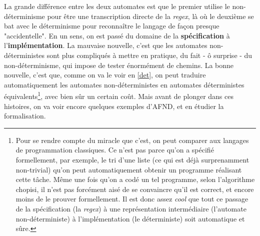 \begin{figure}[!ht]
\centering
{}
\end{figure}

La grande différence entre les deux automates est que le premier utilise le non-déterminisme pour être une transcription directe de la \textit{regex}, là où le deuxième se bat avec le déterminisme pour reconnaître le langage de façon presque "accidentelle". En un sens, on est passé du domaine de la \textbf{spécification} à l'\textbf{implémentation}. La mauvaise nouvelle, c'est que les automates non-déterministes sont plus compliqués à mettre en pratique, du fait - ô surprise - du non-déterminisme, qui impose de tester énormément de chemins. La bonne nouvelle, c'est que, comme on va le voir en \ref{det}, on peut traduire automatiquement les automates non-déterministes en automates déterministes équivalents\footnote{Pour se rendre compte du miracle que c'est, on peut comparer aux langages de programmation classiques. Ce n'est pas parce qu'on a spécifié formellement, par exemple, le tri d'une liste (ce qui est déjà surprenamment non-trivial) qu'on peut automatiquement obtenir un programme réalisant cette tâche. Même une fois qu'on a codé un tel programme, selon l'algorithme chopisi, il n'est pas forcément aisé de se convaincre qu'il est correct, et encore moins de le prouver formellement. Il est donc assez \textit{cool} que tout ce passage de la spécification (la \textit{regex}) à une représentation intermédiaire (l'automate non-déterministe) à l'implémentation (le déterministe) soit automatique et sûre.}, avec bien sûr un certain coût. Mais avant de plonger dans ces histoires, on va voir encore quelques exemples d'AFND, et en étudier la formalisation.

